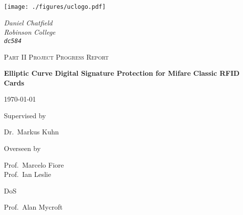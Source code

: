 \documentclass[a4paper, 12pt]{article}
\newcommand\textline[4][t]{%
  \par\smallskip\noindent\parbox[#1]{.333\textwidth}{\raggedright#2}%
  \parbox[#1]{.333\textwidth}{\centering#3}%
  \parbox[#1]{.333\textwidth}{\raggedleft#4}\par\smallskip%
}
\begin{document}
  \begin{titlepage}

    \begin{minipage}[t][][t]{0.5\textwidth}
      \texttt{[image: ./figures/uclogo.pdf]}
    \end{minipage}
    \begin{minipage}{0.5\textwidth}
      \begin{flushright}
        \large
        \textit{Daniel Chatfield}
        \\
        \textit{Robinson College}
        \\
        \texttt{\textit{dc584}}
      \end{flushright}
    \end{minipage}

    \vfill

    \begin{center}

      {\scshape\Large Part II Project Progress Report}
      \vspace{1.5cm}

      {\huge\bfseries Elliptic Curve Digital Signature Protection for Mifare
      Classic RFID Cards\par}
      \vspace{1cm}

      {\large \today}


      \vfill

      \begin{minipage}{0.32\textwidth}
        \begin{center}
    	    Supervised by\par
    	    Dr.~Markus Kuhn
        \end{center}
      \end{minipage}\hfill\noindent
      \begin{minipage}{0.32\textwidth}
        \begin{center}
  	      Overseen by\par
  	      Prof.~Marcelo Fiore \\
          Prof.~Ian Leslie
        \end{center}
      \end{minipage}\hfill
      \begin{minipage}{0.32\textwidth}%
        \begin{center}
  	       DoS\par
  	     Prof.~Alan Mycroft \\
        \end{center}
      \end{minipage}

    \end{center}
  \end{titlepage}
\end{document}
